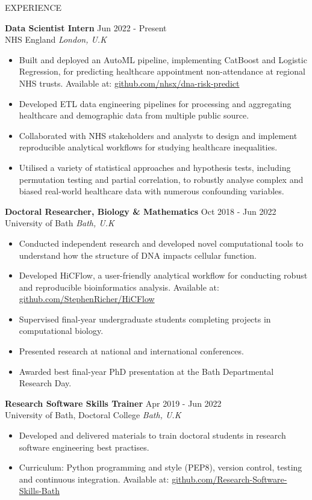 \documentclass{resume} %
\begin{document}
\begin{rSection}{EXPERIENCE}

\textbf{Data Scientist Intern} \hfill Jun 2022 - Present \\
NHS England \hfill \textit{London, U.K}
 \begin{itemize}
    \itemsep -3pt {} 
    \item Built and deployed an AutoML pipeline, implementing CatBoost and Logistic Regression, for predicting healthcare appointment non-attendance at regional NHS trusts. Available at: \href{https://github.com/nhsx/dna-risk-predict}{github.com/nhsx/dna-risk-predict}
    \item Developed ETL data engineering pipelines for processing and aggregating healthcare and demographic data from multiple public source.
    \item Collaborated with NHS stakeholders and analysts to design and implement reproducible analytical workflows for studying healthcare inequalities.
    \item Utilised a variety of statistical approaches and hypothesis tests, including permutation testing and partial correlation, to robustly analyse complex and biased real-world healthcare data with numerous confounding variables.
 \end{itemize}

\textbf{Doctoral Researcher, Biology \& Mathematics} \hfill Oct 2018 - Jun 2022 \\
University of Bath \hfill \textit{Bath, U.K}
 \begin{itemize}
    \itemsep -3pt {} 
    \item Conducted independent research and developed novel computational tools to understand how the structure of DNA impacts cellular function.
    \item Developed HiCFlow, a user-friendly analytical workflow for conducting robust and reproducible bioinformatics analysis. Available at: \href{https://github.com/StephenRicher/HiCFlow}{github.com/StephenRicher/HiCFlow}
    \item Supervised final-year undergraduate students completing projects in computational biology.
    \item Presented research at national and international conferences.
    \item Awarded best final-year PhD presentation at the Bath Departmental Research Day.
 \end{itemize}

\textbf{Research Software Skills Trainer} \hfill Apr 2019 - Jun 2022 \\
University of Bath, Doctoral College \hfill \textit{Bath, U.K}
 \begin{itemize}
    \itemsep -3pt {} 
    \item Developed and delivered materials to train doctoral students in research software engineering best practises.
    \item Curriculum: Python programming and style (PEP8), version control, testing and continuous integration. Available at: \href{https://github.com/Research-Software-Skills-Bath}{github.com/Research-Software-Skills-Bath}
 \end{itemize}


\end{rSection}
\end{document}
